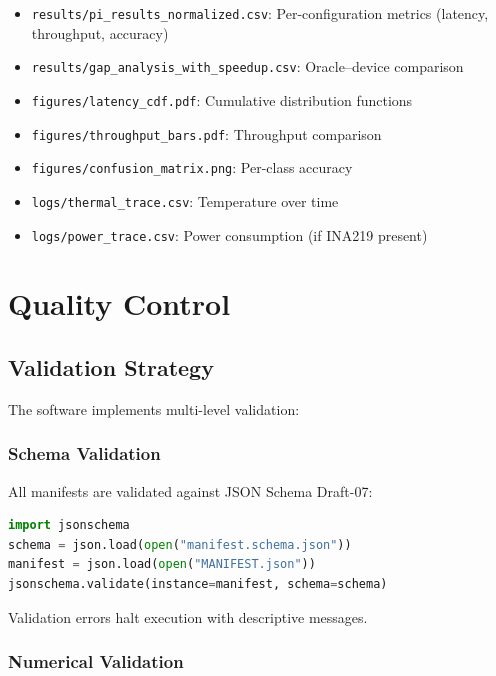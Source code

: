 \documentclass[review]{elsarticle}
\begin{document}
\begin{itemize}
\item \texttt{results/pi\_results\_normalized.csv}: Per-configuration metrics (latency, throughput, accuracy)
\item \texttt{results/gap\_analysis\_with\_speedup.csv}: Oracle--device comparison
\item \texttt{figures/latency\_cdf.pdf}: Cumulative distribution functions
\item \texttt{figures/throughput\_bars.pdf}: Throughput comparison
\item \texttt{figures/confusion\_matrix.png}: Per-class accuracy
\item \texttt{logs/thermal\_trace.csv}: Temperature over time
\item \texttt{logs/power\_trace.csv}: Power consumption (if INA219 present)
\end{itemize}

\section{Quality Control}
\label{sec:quality-control}

\subsection{Validation Strategy}

The software implements multi-level validation:

\subsubsection{Schema Validation}

All manifests are validated against JSON Schema Draft-07:

\begin{lstlisting}[language=Python]
import jsonschema
schema = json.load(open("manifest.schema.json"))
manifest = json.load(open("MANIFEST.json"))
jsonschema.validate(instance=manifest, schema=schema)
\end{lstlisting}

Validation errors halt execution with descriptive messages.

\subsubsection{Numerical Validation}
\end{document}
